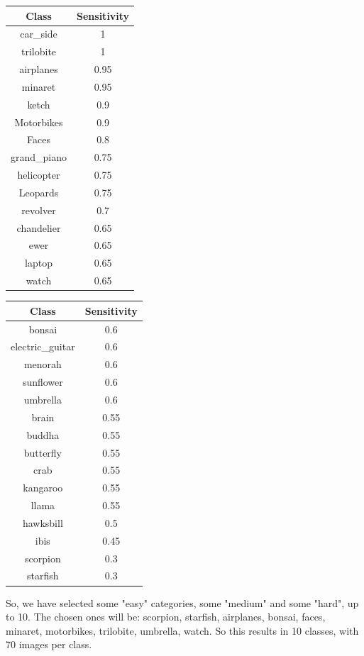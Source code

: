 \begin{table}[H]
\centering
\begin{tabular}{|c|c|}
\hline
\textbf{Class}& \textbf{Sensitivity}      \\ \hline
{car\_side}        & {1}    \\ \hline
{trilobite}        & {1}    \\ \hline
{airplanes}        & {0.95} \\ \hline
{minaret}          & {0.95} \\ \hline
{ketch}            & {0.9}  \\ \hline
{Motorbikes}       & {0.9}  \\ \hline
{Faces}            & {0.8}  \\ \hline
{grand\_piano}     & {0.75} \\ \hline
{helicopter}       & {0.75} \\ \hline
{Leopards}         & {0.75} \\ \hline
{revolver}         & {0.7}  \\ \hline
{chandelier}       & {0.65} \\ \hline
{ewer}             & {0.65} \\ \hline
{laptop}           & {0.65} \\ \hline
{watch}            & {0.65} \\ \hline
\end{tabular}
\centering
\begin{tabular}{|c|c|}
\hline
\textbf{Class}& \textbf{Sensitivity}      \\ \hline
{bonsai}           & {0.6}  \\ \hline
{electric\_guitar} & {0.6}  \\ \hline
{menorah}          & {0.6}  \\ \hline
{sunflower}        & {0.6}  \\ \hline
{umbrella}         & {0.6}  \\ \hline
{brain}            & {0.55} \\ \hline
{buddha}           & {0.55} \\ \hline
{butterfly}        & {0.55} \\ \hline
{crab}             & {0.55} \\ \hline
{kangaroo}         & {0.55} \\ \hline
{llama}            & {0.55} \\ \hline
{hawksbill}        & {0.5}  \\ \hline
{ibis}             & {0.45} \\ \hline
{scorpion}         & {0.3}  \\ \hline
{starfish}         & {0.3}   \\ \hline
\end{tabular}
\end{table}

So, we have selected some "easy" categories, some "medium" and some "hard", up to 10. The chosen ones will be: scorpion, starfish, airplanes, bonsai, faces, minaret, motorbikes, trilobite, umbrella, watch. So this results in 10 classes, with 70 images per class. 
